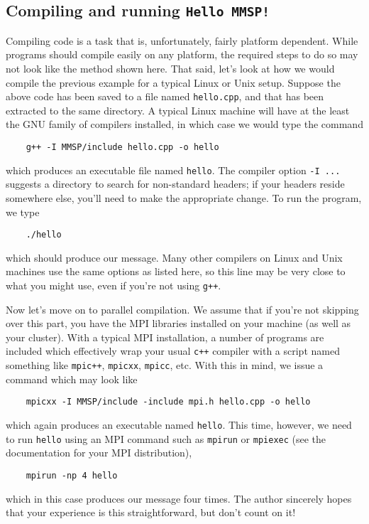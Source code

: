 \subsection{Compiling and running {\tt Hello MMSP!}}
Compiling code is a task that is, unfortunately, fairly platform dependent.  While \MMSP programs should compile easily on any platform, the required steps to do so may not look like the method shown here.  That said, let's look at how we would compile the previous example for a typical Linux or Unix setup.  Suppose the above code has been saved to a file named {\tt hello.cpp}, and that \MMSP has been extracted to the same directory.  A typical Linux machine will have at the least the GNU family of compilers installed, in which case we would type the command 
\begin{shadebox}
\begin{verbatim}
    g++ -I MMSP/include hello.cpp -o hello
\end{verbatim}
\end{shadebox}
which produces an executable file named {\tt hello}.  The compiler option {\tt -I ...} suggests a directory to search for non-standard headers; if your \MMSP headers reside somewhere else, you'll need to make the appropriate change.  To run the program, we type
\begin{shadebox}
\begin{verbatim}
    ./hello
\end{verbatim}
\end{shadebox}
which should produce our message.  Many other compilers on Linux and Unix machines use the same options as listed here, so this line may be very close to what you might use, even if you're not using {\tt g++}.

Now let's move on to parallel compilation.  We assume that if you're not skipping over this part, you have the MPI libraries installed on your machine (as well as your cluster).  With a typical MPI installation, a number of programs are included which effectively wrap your usual {\tt c++} compiler with a script named something like {\tt mpic++}, {\tt mpicxx}, {\tt mpicc}, etc.  With this in mind, we issue a command which may look like
\begin{shadebox}
\begin{verbatim}
    mpicxx -I MMSP/include -include mpi.h hello.cpp -o hello
\end{verbatim}
\end{shadebox}
which again produces an executable named {\tt hello}.  This time, however, we need to run {\tt hello} using an MPI command such as {\tt mpirun} or {\tt mpiexec} (see the documentation for your MPI distribution),
\begin{shadebox}
\begin{verbatim}
    mpirun -np 4 hello
\end{verbatim}
\end{shadebox}
which in this case produces our message four times.  The author sincerely hopes that your experience is this straightforward, but don't count on it!


